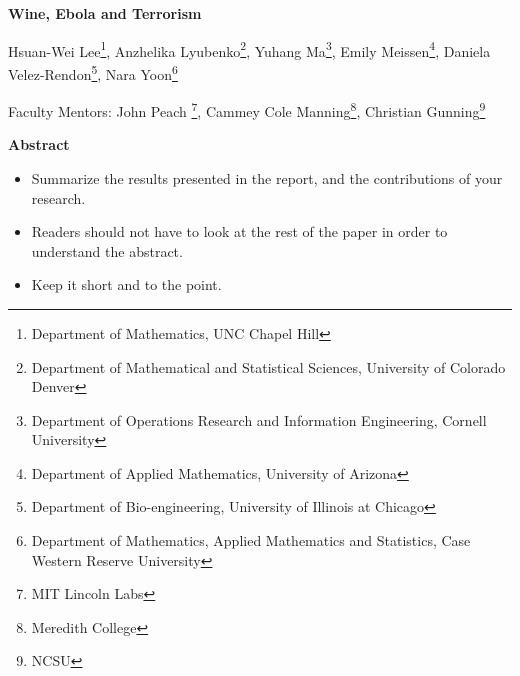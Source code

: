 \documentclass[10pt]{article}
\begin{document}
 


\centerline{\large \bf Wine, Ebola and Terrorism}

\vspace{.1truein}

\def\thefootnote{\arabic{footnote}}
\begin{center}
  Hsuan-Wei Lee\footnote{Department of Mathematics, UNC Chapel Hill},
  Anzhelika Lyubenko\footnote{Department of Mathematical and Statistical Sciences, University of Colorado Denver},
  Yuhang Ma\footnote{Department of Operations Research and Information Engineering, Cornell University},
  Emily Meissen\footnote{Department of Applied Mathematics, University of Arizona},
  Daniela Velez-Rendon\footnote{Department of Bio-engineering, University of Illinois at Chicago},
    Nara Yoon\footnote{
Department of Mathematics, Applied Mathematics and Statistics, Case Western Reserve University}
\end{center}


\begin{center}
Faculty Mentors: John Peach \footnote{MIT Lincoln Labs}, Cammey Cole Manning\footnote{Meredith College},
Christian Gunning\footnote{NCSU}
\end{center}


\vspace{.3truein}
\centerline{\bf Abstract}

\begin{itemize}
\item Summarize the results presented in the report, and the contributions
of your research.

\item Readers should not have to look at the rest of the paper in order to 
understand the abstract.

\item Keep it short and to the point.
\end{itemize}
%
%
%
%
%
%
%
%
%
\end{document}
